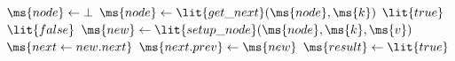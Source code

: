 \begin{algorithm*}[t]
\begin{algorithmic}[1]
\begin{multicols}{2}
{{			\State $\ms{node} \gets \bot$
				\State $\ms{node} \gets \lit{get\_next}(\ms{node}, \ms{k})$
					 \label{lfline:ins-check}
						 \label{lfline:ins-mod}
							\Return $\lit{true}$ \EndReturn
						\EndIf
					\Else
						\Return $\lit{false}$ \EndReturn
					\EndIf
				\Else{}
					\State $\ms{new} \gets \lit{setup\_node}(\ms{node}, \ms{k}, \ms{v})$ \label{lfline:ins-addcall}
					\State $\ms{next \gets new.next}$
					 \label{lfline:ins-rmcheck}
						 \label{lfline:ins-add1}
							\State $\ms{next.prev} \gets \ms{new}$ \label{lfline:ins-add2}
							\Return $\ms{result} \gets \lit{true}$ \EndReturn
						\EndIf
					\EndIf
				\EndIf
			\EndWhile
   		}\EndPart



	}
    \end{multicols}
    
    
  \end{algorithmic}
\algtechrepend
\end{algorithm*}
